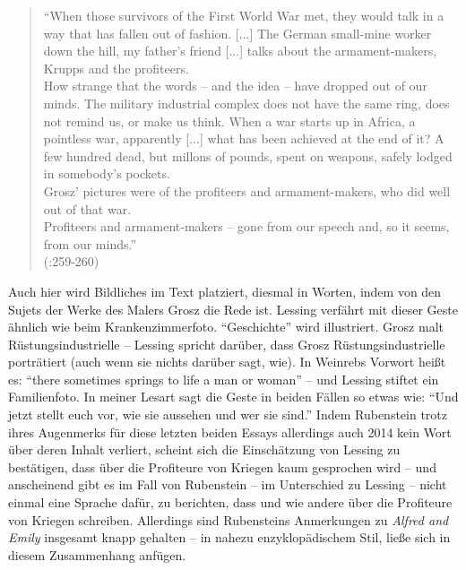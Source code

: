 \documentclass[fontsize=12pt]{scrartcl}
\begin{document}
\singlespacing
\begin{quote}
"`When those survivors of the First World War met, they would talk in a way that has fallen out of fashion. [...] The German small-mine worker down the hill, my father's friend [...] talks about the armament-makers, Krupps and the profiteers.\\ 
How strange that the words -- and the idea -- have dropped out of our minds. The \flq military industrial complex\frq \,\,does not have the same ring, does not remind us, or make us think. When a war starts up in Africa, a pointless war, apparently [...] what has been achieved at the end of it? A few hundred dead, but millons of pounds, spent on weapons, safely lodged in somebody's pockets.\\
Grosz' pictures were of the profiteers and armament-makers, who did well out of that war.\\
Profiteers and armament-makers -- gone from our speech and, so it seems, from our minds."'\\
(\cite{Lessing2008}:259-260)
\end{quote}

\onehalfspacing
Auch \mbox{hier} wird Bildliches im Text platziert, diesmal in Worten, indem von den Sujets der Werke des Malers Grosz die Rede ist. Lessing verf\"ahrt mit dieser Geste \"ahnlich wie beim Krankenzimmerfoto. "`Geschichte"' wird illustriert. Grosz malt R\"ustungsindus\-trielle -- Lessing spricht dar\"uber, dass Grosz R\"ustungsindustrielle portr\"atiert (auch wenn sie nichts dar\"uber sagt, wie). In Weinrebs Vorwort hei{\ss}t es: "`there sometimes springs to life a man or woman"' -- und Lessing stiftet ein Fa\-mi\-lien\-fo\-to. In mei\-ner Lesart sagt die Geste in beiden F\"allen so etwas wie: "`Und jetzt stellt euch vor, wie sie aussehen und wer sie sind."' Indem Rubenstein trotz ihres Augenmerks f\"ur diese letzten beiden Essays al\-ler\-dings auch 2014 kein Wort \"uber deren Inhalt verliert, scheint sich die Einsch\"atzung von Lessing zu best\"atigen, dass \"uber die Profiteure\textsuperscript{\tiny *} von Kriegen kaum gesprochen wird -- und anscheinend gibt es im Fall von Rubenstein -- im Unterschied zu Lessing -- nicht einmal eine Sprache daf\"ur, zu berichten, dass und wie andere \"uber die Profiteure\textsuperscript{\tiny *} von Kriegen schrei\-ben. Al\-ler\-dings sind Rubensteins Anmerkungen zu \textit{Alfred and Emily} insgesamt knapp gehalten -- in nahezu enzyklop\"adischem Stil, lie{\ss}e sich in diesem Zusammenhang anf\"ugen. 
\end{document}

